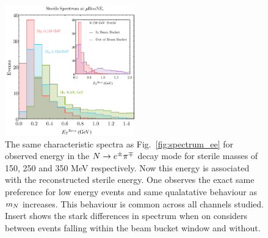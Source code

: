 \documentclass[11pt, a4paper]{article}
\newcommand{\reffig}[1]{Fig.~\ref{#1}}
\def\ster{\ensuremath N}
\begin{document}
\begin{figure}[t]
	\center
		\includegraphics[width=0.5\textwidth]{figures/sterilecomparason.pdf}
	\caption{\label{fig:spectrum_epi} 
		The same characteristic spectra as \reffig{fig:spectrum_ee} for observed energy in the  $\ster\rightarrow e^\pm \pi^\mp$ decay mode for sterile masses of 150,
	250 and 350 MeV respectively. Now this energy is associated with the reconstructed sterile energy. One observes the exact same preference for low energy events and same qualatative behaviour as $m_\ster$ increases. This behaviour is common across all channels studied. Insert shows the stark differences in spectrum when on considers between events falling within the beam bucket window and without. }
\end{figure}
\end{document}
